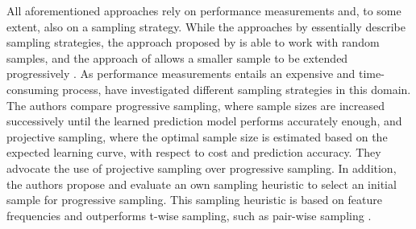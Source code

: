 All aforementioned approaches rely on performance measurements and, to
some extent, also on a  sampling strategy. While the approaches by
\cite{siegmund_predicting_2012,siegmund_performance-influence_2015} essentially describe sampling strategies,
the approach proposed by \cite{zhang_performance_2015} is able to work with random samples, and the
approach of \cite{guo_variability-aware_2013} allows a smaller sample to be
extended progressively \citep{guo_variability-aware_2013}.
As performance measurements entails an expensive and time-consuming process,
\cite{sarkar_cost-efficient_2015} have investigated different sampling
strategies in this domain.
The authors compare progressive sampling, where sample sizes are increased
successively until the learned prediction model performs accurately enough, and projective
sampling, where the optimal sample size is estimated based on the expected
learning curve, with respect to cost and prediction accuracy. They advocate the
use of projective sampling over progressive sampling. In addition, the authors
propose and evaluate an own sampling heuristic to select an initial sample for
progressive sampling. This sampling heuristic is based on feature frequencies
and outperforms t-wise sampling, such as pair-wise sampling
\citep{sarkar_cost-efficient_2015}.